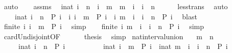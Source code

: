 \begin{isabellebody}
\ auto\isanewline
\ \ \isamarkupfalse%
\ assms\ \isamarkupfalse%
\ {\isacartoucheopen}{\isasymforall}i{\isacharcolon}{\isacharcolon}nat{\isachardot}\ i\ {\isacharless}\ n\ {\isacharequal}\ {\isacharparenleft}i\ {\isacharless}\ m{\isacharparenright}\ {\isasymor}\ {\isacharparenleft}m\ {\isasymle}\ i\ {\isasymand}\ i\ {\isacharless}\ n{\isacharparenright}{\isacartoucheclose}\isanewline
\ \ \ \ \isamarkupfalse%
\ less{\isacharunderscore}trans\ \isamarkupfalse%
\ auto\isanewline
\ \ \isamarkupfalse%
\ {}{\isacharcolon}\isanewline
\ \ \ \ {\isacartoucheopen}{\isacharbraceleft}i{\isacharcolon}{\isacharcolon}nat{\isachardot}\ i\ {\isacharless}\ n\ {\isasymand}\ P\ i{\isacharbraceright}\ {\isacharequal}\ {\isacharbraceleft}i{\isachardot}\ i\ {\isacharless}\ m\ {\isasymand}\ P\ i{\isacharbraceright}\ {\isasymunion}\ {\isacharbraceleft}i{\isachardot}\ m\ {\isasymle}\ i\ {\isasymand}\ i\ {\isacharless}\ n\ {\isasymand}\ P\ i{\isacharbraceright}{\isacartoucheclose}\ \isamarkupfalse%
\ blast\isanewline
\ \ \isamarkupfalse%
\ {}{\isacharcolon}{\isacartoucheopen}finite\ {\isacharbraceleft}i{\isachardot}\ i\ {\isacharless}\ m\ {\isasymand}\ P\ i{\isacharbraceright}{\isacartoucheclose}\ \isamarkupfalse%
\ simp\isanewline
\ \ \isamarkupfalse%
\ {}{\isacharcolon}{\isacartoucheopen}finite\ {\isacharbraceleft}i{\isachardot}\ m\ {\isasymle}\ i\ {\isasymand}\ i\ {\isacharless}\ n\ {\isasymand}\ P\ i{\isacharbraceright}{\isacartoucheclose}\ \isamarkupfalse%
\ simp\isanewline
\ \ \isamarkupfalse%
\ card{\isacharunderscore}Un{\isacharunderscore}disjoint{\isacharbrackleft}OF\ {}\ {}\ {}{\isacharbrackright}\ {}\ \isamarkupfalse%
\ {\isacharquery}thesis\ \isamarkupfalse%
\ simp\isanewline
{}\isamarkupfalse%
%
\endisatagproof
{\isafoldproof}%
%
\isadelimproof
\isanewline
%
\endisadelimproof
\isanewline
{}\isamarkupfalse%
\ nat{\isacharunderscore}interval{\isacharunderscore}union{\isacharcolon}\isanewline
\ \ \ {\isacartoucheopen}m\ {\isasymle}\ n{\isacartoucheclose}\isanewline
\ \ \ \ \ {\isacartoucheopen}{\isacharbraceleft}i{\isacharcolon}{\isacharcolon}nat{\isachardot}\ i\ {\isasymle}\ n\ {\isasymand}\ P\ i{\isacharbraceright}\isanewline
\ \ \ \ \ \ \ \ \ {\isacharequal}\ {\isacharbraceleft}i{\isacharcolon}{\isacharcolon}nat{\isachardot}\ i\ {\isasymle}\ m\ {\isasymand}\ P\ i{\isacharbraceright}\ {\isasymunion}\ {\isacharbraceleft}i{\isacharcolon}{\isacharcolon}nat{\isachardot}\ m\ {\isacharless}\ i\ {\isasymand}\ i\ {\isasymle}\ n\ {\isasymand}\ P\ i{\isacharbraceright}{\isacartoucheclose}\isanewline

\end{isabellebody}
